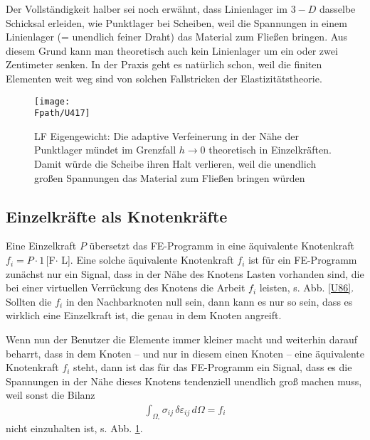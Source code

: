 {{{{{{\begin{remark}
Der Vollst\"{a}ndigkeit halber sei noch erw\"{a}hnt, dass Linien\-lager im $3-D$ dasselbe Schicksal erleiden, wie Punktlager bei Scheiben, weil die Spannungen in einem Linienlager (= unendlich feiner Draht) das Material zum Flie{\ss}en bringen. Aus diesem Grund kann man theoretisch auch kein Linienlager um ein oder zwei Zentimeter senken. In der Praxis geht es nat\"{u}rlich schon, weil die finiten Elementen weit weg sind von solchen Fallstricken der Elastizit\"{a}tstheorie.
\end{remark}

\begin{figure}
\centering
\if {} \sidecaption[t] \fi
{\texttt{[image: \\Fpath/U417]}}
\caption{LF Eigengewicht: Die adaptive Verfeinerung in der N\"{a}he der Punktlager m\"{u}ndet im Grenzfall $h \to 0$ theoretisch in Einzelkr\"{a}ften. Damit w\"{u}rde die Scheibe ihren Halt verlieren, weil die unendlich gro{\ss}en Spannungen das Material zum Flie{\ss}en bringen w\"{u}rden}
\label{U417}%
\end{figure}%
\vspace{-1cm}
{\textcolor{sectionTitleBlue}{\section{Einzelkr\"{a}fte als Knotenkr\"{a}fte}}}
Eine Einzelkraft $ P$ \"{u}bersetzt das FE-Programm in eine \"{a}quivalente Knotenkraft $f_i = P \cdot 1$\,[F$\cdot$ L]. Eine solche \"{a}quivalente Knotenkraft $f_i$ ist f\"{u}r ein FE-Programm zun\"{a}chst nur ein Signal, dass in der N\"{a}he des Knotens Lasten vorhanden sind, die bei einer virtuellen Verr\"{u}ckung des Knotens die Arbeit $f_i $ leisten, s. Abb. \ref{U86}. Sollten die $f_i$ in den Nachbarknoten null sein, dann kann es nur so sein, dass es wirklich eine Einzelkraft ist, die genau in dem Knoten angreift.

Wenn nun der Benutzer die Elemente immer kleiner macht und weiterhin darauf beharrt, dass in dem Knoten -- und nur in diesem einen Knoten -- eine \"{a}quivalente Knotenkraft $f_i $ steht, dann ist das f\"{u}r das FE-Programm ein Signal, dass es die Spannungen in der N\"{a}he dieses Knotens tendenziell unendlich gro{\ss} machen muss, weil sonst die Bilanz
\begin{align}
 \int_{\Omega_\square} \sigma_{ij}\,\delta \varepsilon_{ij} \,d\Omega = f_i
\end{align}
nicht einzuhalten ist, s. Abb. \ref{U417}.

}}}}}}
